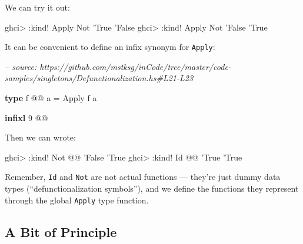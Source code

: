 \documentclass[]{article}
\newenvironment{Shaded}{}{}
\newcommand{\CommentTok}[1]{\textcolor[rgb]{0.38,0.63,0.69}{\textit{#1}}}
\newcommand{\DataTypeTok}[1]{\textcolor[rgb]{0.56,0.13,0.00}{#1}}
\newcommand{\DecValTok}[1]{\textcolor[rgb]{0.25,0.63,0.44}{#1}}
\newcommand{\FunctionTok}[1]{\textcolor[rgb]{0.02,0.16,0.49}{#1}}
\newcommand{\KeywordTok}[1]{\textcolor[rgb]{0.00,0.44,0.13}{\textbf{#1}}}
\newcommand{\NormalTok}[1]{#1}
\begin{document}
We can try it out:

\begin{Shaded}
\begin{Highlighting}[]
\NormalTok{ghci}\FunctionTok{>} \FunctionTok{:}\NormalTok{kind}\FunctionTok{!} \DataTypeTok{Apply} \DataTypeTok{Not}\NormalTok{ '}\DataTypeTok{True}
\NormalTok{'}\DataTypeTok{False}
\NormalTok{ghci}\FunctionTok{>} \FunctionTok{:}\NormalTok{kind}\FunctionTok{!} \DataTypeTok{Apply} \DataTypeTok{Not}\NormalTok{ '}\DataTypeTok{False}
\NormalTok{'}\DataTypeTok{True}
\end{Highlighting}
\end{Shaded}

It can be convenient to define an infix synonym for \texttt{Apply}:

\begin{Shaded}
\begin{Highlighting}[]
\CommentTok{-- source: https://github.com/mstksg/inCode/tree/master/code-samples/singletons/Defunctionalization.hs#L21-L23}

\KeywordTok{type}\NormalTok{ f }\FunctionTok{@@}\NormalTok{ a }\FunctionTok{=} \DataTypeTok{Apply}\NormalTok{ f a}

\KeywordTok{infixl} \DecValTok{9} \FunctionTok{@@}
\end{Highlighting}
\end{Shaded}

Then we can wrote:

\begin{Shaded}
\begin{Highlighting}[]
\NormalTok{ghci}\FunctionTok{>} \FunctionTok{:}\NormalTok{kind}\FunctionTok{!} \DataTypeTok{Not} \FunctionTok{@@}\NormalTok{ '}\DataTypeTok{False}
\NormalTok{'}\DataTypeTok{True}
\NormalTok{ghci}\FunctionTok{>} \FunctionTok{:}\NormalTok{kind}\FunctionTok{!} \DataTypeTok{Id} \FunctionTok{@@}\NormalTok{ '}\DataTypeTok{True}
\NormalTok{'}\DataTypeTok{True}
\end{Highlighting}
\end{Shaded}

Remember, \texttt{Id} and \texttt{Not} are not actual functions --- they're just
dummy data types (``defunctionalization symbols''), and we define the functions
they represent through the global \texttt{Apply} type function.

\hypertarget{a-bit-of-principle}{%
\subsection{A Bit of Principle}\label{a-bit-of-principle}}
\end{document}
